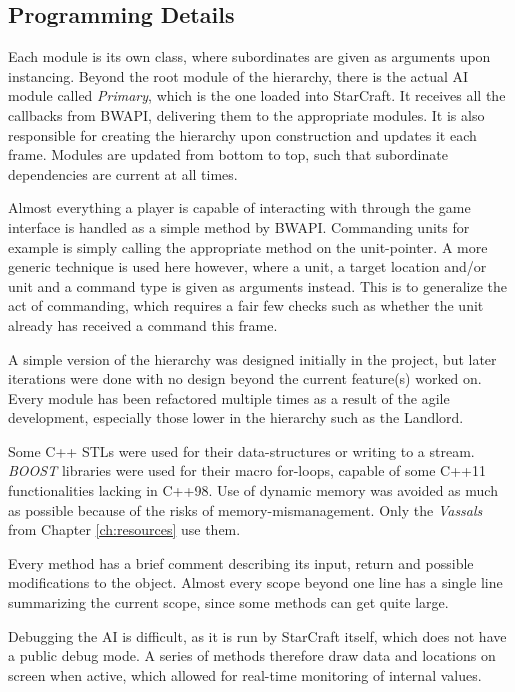 	\subsection*{Programming Details}
	Each module is its own class, where subordinates are given as arguments upon instancing. Beyond the root module of the hierarchy, there is the actual AI module called \emph{Primary}, which is the one loaded into StarCraft. It receives all the callbacks from BWAPI, delivering them to the appropriate modules. It is also responsible for creating the hierarchy upon construction and updates it each frame. Modules are updated from bottom to top, such that subordinate dependencies are current at all times.
	
	Almost everything a player is capable of interacting with through the game interface is handled as a simple method by BWAPI. Commanding units for example is simply calling the appropriate method on the unit-pointer. A more generic technique is used here however, where a unit, a target location and/or unit and a command type is given as arguments instead. This is to generalize the act of commanding, which requires a fair few checks such as whether the unit already has received a command this frame.
	
	A simple version of the hierarchy was designed initially in the project, but later iterations were done with no design beyond the current feature(s) worked on. Every module has been refactored multiple times as a result of the agile development, especially those lower in the hierarchy such as the Landlord.
	
	Some C++ STLs were used for their data-structures or writing to a stream. \emph{BOOST} libraries were used for their macro for-loops, capable of some C++11 functionalities lacking in C++98. Use of dynamic memory was avoided as much as possible because of the risks of memory-mismanagement. Only the \emph{Vassals} from Chapter \ref{ch:resources} use them.
	
	Every method has a brief comment describing its input, return and possible modifications to the object. Almost every scope beyond one line has a single line summarizing the current scope, since some methods can get quite large.
	
	Debugging the AI is difficult, as it is run by StarCraft itself, which does not have a public debug mode. A series of methods therefore draw data and locations on screen when active, which allowed for real-time monitoring of internal values.